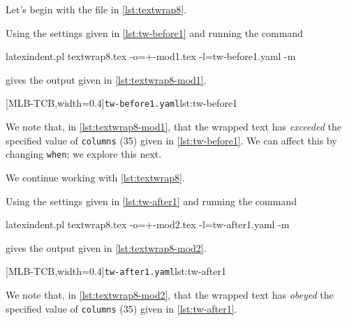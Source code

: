 \documentclass[10pt]{article}
\begin{document}
 \begin{example}
 Let's begin with the file in \cref{lst:textwrap8}.


 Using the settings given in \cref{lst:tw-before1} and running the command

 \begin{commandshell}
latexindent.pl textwrap8.tex -o=+-mod1.tex -l=tw-before1.yaml -m
   \end{commandshell}

 gives the output given in \cref{lst:textwrap8-mod1}.

 \begin{cmhtcbraster}[raster columns=2,
   raster left skip=-1.5cm,
   raster right skip=-0cm,
   raster column skip=.06\linewidth]
  [MLB-TCB,width=0.4\linewidth]{\texttt{tw-before1.yaml}}{lst:tw-before1}
 \end{cmhtcbraster}

 We note that, in \cref{lst:textwrap8-mod1}, that the wrapped text has \emph{exceeded}
 the specified value of \texttt{columns} (35) given in \cref{lst:tw-before1}. We can
 affect this by changing \texttt{when}; we explore this next.
 \end{example}

 \begin{example}
 We continue working with \cref{lst:textwrap8}.

 Using the settings given in \cref{lst:tw-after1} and running the command

 \begin{commandshell}
latexindent.pl textwrap8.tex -o=+-mod2.tex -l=tw-after1.yaml -m
   \end{commandshell}

 gives the output given in \cref{lst:textwrap8-mod2}.

 \begin{cmhtcbraster}[raster columns=2,
   raster left skip=-1.5cm,
   raster right skip=-0cm,
   raster column skip=.06\linewidth]
  [MLB-TCB,width=0.4\linewidth]{\texttt{tw-after1.yaml}}{lst:tw-after1}
 \end{cmhtcbraster}

 We note that, in \cref{lst:textwrap8-mod2}, that the wrapped text has \emph{obeyed} the
 specified value of \texttt{columns} (35) given in \cref{lst:tw-after1}.
 \end{example}
\end{document}
